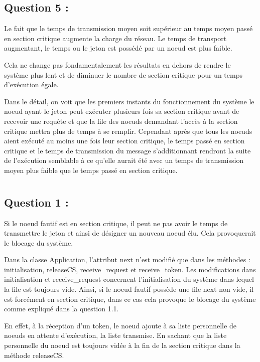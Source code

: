 \documentclass[11pt,a4paper]{report}
\begin{document}
\section{Question 5 :}

Le fait que le temps de transmission moyen soit supérieur au temps moyen passé en section critique augmente la charge du réseau. Le temps de transport augmentant, le temps ou le jeton est possédé par un noeud est plus faible.

Cela ne change pas fondamentalement les résultats en dehors de rendre le système plus lent et de diminuer le nombre de section critique pour un temps d'exécution égale.

Dans le détail, on voit que les premiers instants du fonctionnement du système le noeud ayant le jeton peut exécuter plusieurs fois sa section critique avant de recevoir une requête et que la file des noeuds demandant l'accès à la section critique mettra plus de temps à se remplir. Cependant après que tous les noeuds aient exécuté au moins une fois leur section critique, le temps passé en section critique et le temps de transmission du message s'additionnant rendront la suite de l'exécution semblable à ce qu'elle aurait été avec un temps de transmission moyen plus faible que le temps passé en section critique.


\chapter{}

\section{Question 1 :}

 Si le noeud fautif est en section critique, il peut ne pas avoir le temps de transmettre le jeton et ainsi de désigner un nouveau noeud élu. Cela provoquerait le blocage du système. 

 Dans la classe Application, l'attribut next n'est modifié que dans les méthodes : initialisation, releaseCS, receive_request et receive_token. Les modifications dans initialisation et receive_request concernent l'initialisation du système dans lequel la file est toujours vide. Ainsi, si le noeud fautif possède une file next non vide, il est forcément en section critique, dans ce cas cela provoque le blocage du système comme expliqué dans la question 1.1.

En effet, à la réception d'un token, le noeud ajoute à sa liste personnelle de noeuds en attente d'exécution, la liste transmise. En sachant que la liste personnelle du noeud est toujours vidée à la fin de la section critique dans la méthode releaseCS.
\end{document}
